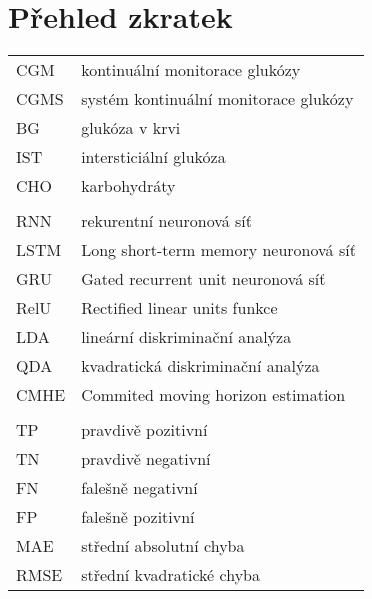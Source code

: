 \chapter*{Přehled zkratek}

\begin{tabular}{ll}
CGM & kontinuální monitorace glukózy\\
CGMS & systém kontinuální monitorace glukózy\\
BG & glukóza v krvi\\
IST & intersticiální glukóza\\
CHO & karbohydráty\\
\\
RNN & rekurentní neuronová síť\\
LSTM & Long short-term memory neuronová síť\\
GRU & Gated recurrent unit neuronová síť\\
RelU & Rectified linear units funkce\\
LDA & lineární diskriminační analýza\\
QDA & kvadratická diskriminační analýza\\
CMHE & Commited moving horizon estimation\\
\\
TP & pravdivě pozitivní\\
TN & pravdivě negativní\\
FN & falešně negativní\\
FP & falešně pozitivní\\
MAE & střední absolutní chyba\\
RMSE & střední kvadratické chyba\\
\end{tabular}
